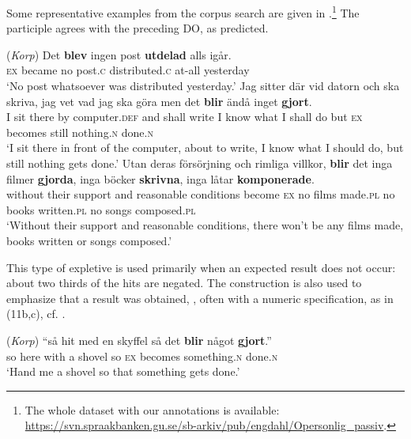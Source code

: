 \documentclass[output=paper]{LSP/langsci}
\begin{document}
Some representative examples from the corpus search are given in .\footnote{The whole dataset with our annotations is available: \url{https://svn.spraakbanken.gu.se/sb-arkiv/pub/engdahl/Opersonlig\_passiv}.} The participle agrees with the preceding DO, as predicted.

\ea%
\label{ex:engdahl:10}
 (\textit{Korp})
\ea \label{ex:engdahl:10a}
\gll  Det \textbf{blev}     ingen   post     \textbf{utdelad}   alls     igår.\\
   \textsc{ex} became no post.\textsc{c}  distributed.\textsc{c}  at-all  yesterday\\
   \glt ‘No post  whatsoever  was  distributed  yesterday.'
\ex \label{ex:engdahl:10b}
\gll Jag sitter där   vid   datorn   och   ska   skriva,   jag   vet   vad   jag   ska   göra men det \textbf{blir}  ändå inget  \textbf{gjort}.  \\
    I    sit  there  by  computer.\textsc{def} and shall  write I know  what  I shall  do    {but} \textsc{ex}  becomes still  nothing\textsc{.n}  {done}\textsc{.n}\\
\glt ‘I sit there in front of the computer, about to write, I know what I should do, but still nothing gets done.’
\ex \label{ex:engdahl:10c}
\gll Utan     deras   försörjning   och   rimliga  villkor,  \textbf{blir} det inga filmer \textbf{gjorda}, inga böcker \textbf{skrivna},     inga låtar \textbf{komponerade}.\\
 without  their   support  and reasonable  conditions become \textsc{ex}  no    films    made.\textsc{pl}  no    books  written.\textsc{pl}  no    songs  composed.\textsc{pl}\\
 \glt ‘Without their support and reasonable conditions, there won't be any films made,  books written or songs composed.'
\z
\z

\noindent This type of expletive  is used primarily when an expected result does not occur: about two thirds of the hits are negated. The construction is also used to emphasize that a result was obtained, , often with a numeric specification, as in (11b,c), cf. .

\ea%
    \label{ex:engdahl:11}
  (\textit{Korp})   
\ea \label{ex:engdahl:11a}
\gll   “så hit     med en   skyffel   så   det   \textbf{blir}  något    \textbf{gjort}.” \\
 so here with a shovel so  \textsc{ex} becomes  something\textsc{.n} done\textsc{.n}\\
    \glt ‘Hand me a shovel so that something gets done.’
\end{document}
